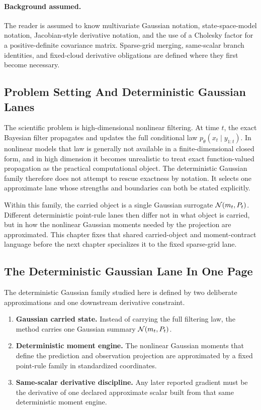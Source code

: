 \paragraph{Background assumed.}
The reader is assumed to know multivariate Gaussian notation, state-space-model
notation, Jacobian-style derivative notation, and the use of a Cholesky factor
for a positive-definite covariance matrix.  Sparse-grid merging, same-scalar
branch identities, and fixed-cloud derivative obligations are defined where they
first become necessary.

\subsection{Problem Setting And Deterministic Gaussian Lanes}
\label{sec:bf-hd-gq-problem-lane}

The scientific problem is high-dimensional nonlinear filtering.  At time
\(t\), the exact Bayesian filter propagates and updates the full conditional law
\(p_\theta(x_t\mid y_{1:t})\).  In nonlinear models that law is generally not
available in a finite-dimensional closed form, and in high dimension it becomes
unrealistic to treat exact function-valued propagation as the practical
computational object.  The deterministic Gaussian family therefore does not
attempt to rescue exactness by notation.  It selects one approximate lane whose
strengths and boundaries can both be stated explicitly.

Within this family, the carried object is a single Gaussian surrogate
\(\mathcal{N}(m_t,P_t)\).  Different deterministic point-rule lanes then differ not in
what object is carried, but in how the nonlinear Gaussian moments needed by the
projection are approximated.  This chapter fixes that shared carried-object and
moment-contract language before the next chapter specializes it to the fixed
sparse-grid lane.

\subsection{The Deterministic Gaussian Lane In One Page}
\label{sec:bf-hd-gq-one-page}

The deterministic Gaussian family studied here is defined by two deliberate
approximations and one downstream derivative constraint.
\begin{enumerate}[leftmargin=0.28in]
  \item \textbf{Gaussian carried state.}  Instead of carrying the full filtering
  law, the method carries one Gaussian summary \(\mathcal{N}(m_t,P_t)\).
  \item \textbf{Deterministic moment engine.}  The nonlinear Gaussian moments that
  define the prediction and observation projection are approximated by a fixed
  point-rule family in standardized coordinates.
  \item \textbf{Same-scalar derivative discipline.}  Any later reported gradient must
  be the derivative of one declared approximate scalar built from that same
  deterministic moment engine.
\end{enumerate}


